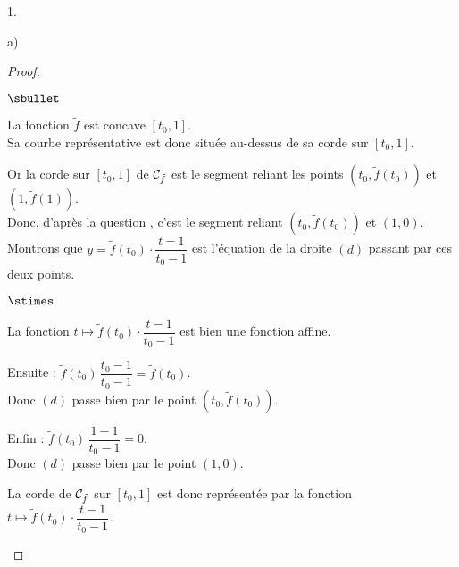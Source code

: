 \documentclass[11pt]{article}%
\begin{document}
\begin{noliste}{1.}
\begin{noliste}{a)}
  \begin{proof}~
    \begin{noliste}{$\sbullet$}
      \item La fonction $\tilde{f}$ est concave $[t_0,1]$.\\
      Sa courbe représentative est donc située au-dessus de sa corde 
      sur $[t_0,1]$.
      
      \item Or la corde sur $[t_0,1]$ de ${\cal C}_{\tilde{f}}$ est le 
      segment 
      reliant les points $(t_0,\tilde{f}(t_0))$ et $(1,\tilde{f}(1))$.\\
      Donc, d'après la question , c'est le segment reliant 
      $(t_0,\tilde{f}(t_0))$ et $(1,0)$.\\
      Montrons que $y= \tilde{f}(t_0) \cdot \dfrac{t-1}{t_0-1}$ est 
      l'équation de la droite $(d)$ passant par ces deux points.
      \begin{noliste}{$\stimes$}
        \item La fonction $t\mapsto \tilde{f}(t_0) \cdot 
	\dfrac{t-1}{t_0-1}$ est bien une fonction affine.
        \item Ensuite : $\tilde{f}(t_0) \, \dfrac{t_0-1}{t_0-1} = 
        \tilde{f}(t_0)$.\\[.1cm]
        Donc $(d)$ passe bien 
        par le point $(t_0,\tilde{f}(t_0))$.
        \item Enfin : $\tilde{f}(t_0) \, \dfrac{1-1}{t_0-1} = 
	0$.\\[.1cm]
        Donc $(d)$ 
        passe bien par le point $(1,0)$.
      \end{noliste}
      La corde de ${\cal C}_{\tilde{f}}$ sur $[t_0,1]$ est donc 
      représentée par la fonction $t \mapsto \tilde{f}(t_0) \cdot
      \dfrac{t-1}{t_0-1}$.
% 
%       

\end{noliste}
\end{proof}
\end{noliste}
\end{noliste}
\end{document}
